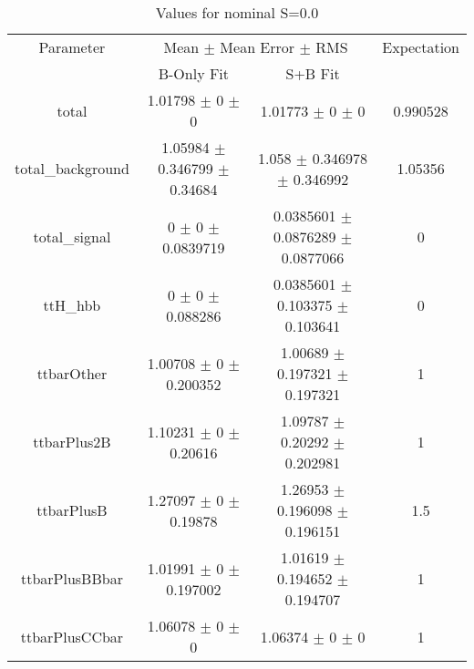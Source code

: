 \begin{table}
\centering
\caption{Values for nominal S=0.0}
\begin{tabular}{cccc}
\toprule
Parameter & \multicolumn{2}{c}{Mean $\pm$ Mean Error $\pm$ RMS} & Expectation\\
 & B-Only Fit & S+B Fit & \\
\midrule
total & \num{1.01798} $\pm$ \num{0} $\pm$ \num{0} & \num{1.01773} $\pm$ \num{0} $\pm$ \num{0} & \num{0.990528}\\
total\_background & \num{1.05984} $\pm$ \num{0.346799} $\pm$ \num{0.34684} & \num{1.058} $\pm$ \num{0.346978} $\pm$ \num{0.346992} & \num{1.05356}\\
total\_signal & \num{0} $\pm$ \num{0} $\pm$ \num{0.0839719} & \num{0.0385601} $\pm$ \num{0.0876289} $\pm$ \num{0.0877066} & \num{0}\\
ttH\_hbb & \num{0} $\pm$ \num{0} $\pm$ \num{0.088286} & \num{0.0385601} $\pm$ \num{0.103375} $\pm$ \num{0.103641} & \num{0}\\
ttbarOther & \num{1.00708} $\pm$ \num{0} $\pm$ \num{0.200352} & \num{1.00689} $\pm$ \num{0.197321} $\pm$ \num{0.197321} & \num{1}\\
ttbarPlus2B & \num{1.10231} $\pm$ \num{0} $\pm$ \num{0.20616} & \num{1.09787} $\pm$ \num{0.20292} $\pm$ \num{0.202981} & \num{1}\\
ttbarPlusB & \num{1.27097} $\pm$ \num{0} $\pm$ \num{0.19878} & \num{1.26953} $\pm$ \num{0.196098} $\pm$ \num{0.196151} & \num{1.5}\\
ttbarPlusBBbar & \num{1.01991} $\pm$ \num{0} $\pm$ \num{0.197002} & \num{1.01619} $\pm$ \num{0.194652} $\pm$ \num{0.194707} & \num{1}\\
ttbarPlusCCbar & \num{1.06078} $\pm$ \num{0} $\pm$ \num{0} & \num{1.06374} $\pm$ \num{0} $\pm$ \num{0} & \num{1}\\
\bottomrule
\end{tabular}
\end{table}